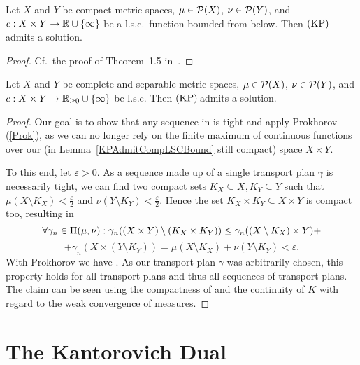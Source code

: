 \begin{lemma}\label{KPAdmitCompLSCBound}
	Let $X$ and $Y$ be compact metric spaces, $\mu \in \PM{X}$, $\nu \in \PM{Y}$, and $\map[c]{X \times Y}{\R \cup \{ \infty \}}$ be a l.s.c.\ function bounded from below. Then$\text{\normalfont\ (KP)\,}$admits a solution.
\end{lemma}

\begin{proof}
	Cf.~the proof of Theorem~1.5 in~\cite{San2015}.
\end{proof}

\begin{theorem}\label{KPAdmitPolishLSC}
	Let $X$ and $Y$ be complete and separable metric spaces, $\mu \in \PM{X}$, $\nu \in \PM{Y}$, and $\map[c]{X \times Y}{\RZero \cup \{ \infty \}}$ be l.s.c. Then$\text{\normalfont\ (KP)\,}$admits a solution.
\end{theorem}

\begin{proof}
	Our goal is to show that any sequence in \TP{\mu}{\nu} is tight and apply Prokhorov (\ref{Prok}), as we can no longer rely on the finite maximum of continuous functions over our (in Lemma~\ref{KPAdmitCompLSCBound} still compact) space $X \times Y$.

	To this end, let $\varepsilon > 0$. As a sequence made up of a single transport plan $\gamma$ is necessarily tight, we can find two compact sets $K_X \subseteq X, K_Y \subseteq Y$ such that $\mu(X \setminus K_X) < \frac{\varepsilon}{2}$ and $\nu(Y \setminus K_Y) < \frac{\varepsilon}{2}$. Hence the set $K_X \times K_Y \subseteq X \times Y$ is compact too, resulting in
	\[ \forall \gamma_n \in \TP{\mu}{\nu}: \gamma_n((X \times Y) \setminus (K_X \times K_Y)) \le \gamma_n ((X \setminus K_X) \times Y) + \]
	\[ + \gamma_n(X \times (Y \setminus K_Y)) = \mu(X \setminus K_X) + \nu(Y \setminus K_Y) < \varepsilon. \]
	With Prokhorov we have . As our transport plan $\gamma$ was arbitrarily chosen, this property holds for all transport plans and thus all sequences of transport plans. The claim can be seen using the compactness of \TP{\mu}{\nu} and the continuity of $K$ with regard to the weak convergence of measures.
\end{proof}

\section{The Kantorovich Dual}\label{KanDual}

